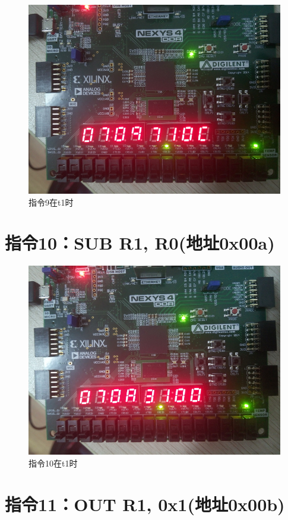 \documentclass[forprint]{WHUBachelor}
\begin{document}
\begin{figure}[H]
  \centering
  \includegraphics[width=5in]{figures/download/80.jpg}
  \caption{指令9在t1时}
  \label{fig:down:80}
\end{figure}

\section{指令10：SUB R1, R0(地址0x00a)}

\begin{figure}[H]
  \centering
  \includegraphics[width=5in]{figures/download/90.jpg}
  \caption{指令10在t1时}
  \label{fig:down:90}
\end{figure}

\section{指令11：OUT R1, 0x1(地址0x00b)}
\end{document}
